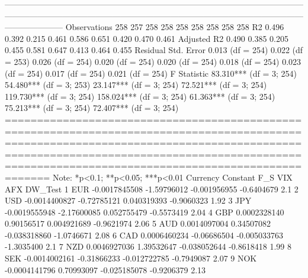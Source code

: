 ---------------------------------------------------------------------------------------------------------------------------------------------------------------------------------------------------------------------------------------------
Observations                  258                     257                     258                     258                     258                      258                      258                     258                     258          
R2                           0.496                   0.392                   0.215                   0.461                   0.586                    0.651                    0.420                   0.470                   0.461         
Adjusted R2                  0.490                   0.385                   0.205                   0.455                   0.581                    0.647                    0.413                   0.464                   0.455         
Residual Std. Error    0.013 (df = 254)        0.022 (df = 253)        0.026 (df = 254)        0.020 (df = 254)         0.020 (df = 254)         0.018 (df = 254)        0.023 (df = 254)        0.017 (df = 254)        0.021 (df = 254)    
F Statistic         83.310*** (df = 3; 254) 54.480*** (df = 3; 253) 23.147*** (df = 3; 254) 72.521*** (df = 3; 254) 119.730*** (df = 3; 254) 158.024*** (df = 3; 254) 61.363*** (df = 3; 254) 75.213*** (df = 3; 254) 72.407*** (df = 3; 254)
=============================================================================================================================================================================================================================================
Note:                                                                                                                                                                                                             *p<0.1; **p<0.05; ***p<0.01
  Currency      Constant         F_S          VIX        AFX DW_Test
1      EUR -0.0017845508 -1.59796012 -0.001956955 -0.6404679     2.1
2      USD -0.0014400827 -0.72785121  0.040319393 -0.9060323    1.92
3      JPY -0.0019555948 -2.17600085  0.052755479 -0.5573419    2.04
4      GBP  0.0002328140  0.90156517  0.004921689 -0.9621974    2.06
5      AUD  0.0014097004  0.34507082 -0.038318860 -1.0746671    2.08
6      CAD  0.0006460234 -0.06686504 -0.005033763 -1.3035400     2.1
7      NZD  0.0046927036  1.39532647 -0.038052644 -0.8618418    1.99
8      SEK -0.0014002161 -0.31866233 -0.012722785 -0.7949087    2.07
9      NOK -0.0004141796  0.70993097 -0.025185078 -0.9206379    2.13


